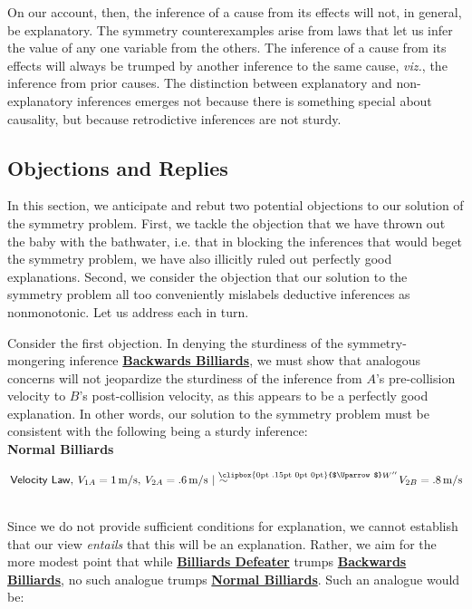 \documentclass[natbib]{svjour3}                     %
\makeatletter
\newcommand{\Uuparrow}{%
	\raisebox{.2ex}{\clipbox{0pt .15pt 0pt 0pt}{$\Uparrow$}}
}
\newcommand{\nms}{%
	\mathbin{\mathpalette\@nms\expandafter}
}
\newcommand{\@nms}{\mid\joinrel\mkern-.5mu\sim}
\newcommand{\mrc}[1]{\mathbin{
		\mathchoice
		{\normalsize\hspace{.5mm}\nms^{\mkern-19mu\scriptsize\Uuparrow#1}\hspace{-.5mm}}
		{\normalsize\hspace{.5mm}\nms^{\mkern-19mu\scriptsize\Uuparrow#1}\hspace{-.5mm}}
		{\footnotesize\hspace{.5mm}\nms^{\mkern-13.5mu\fontsize{5.5}{0}\Uuparrow#1}}
		{\scriptsize\nms^{\mkern-10mu\tiny\Uuparrow#1}}
	}
}
\makeatother
\begin{document}
On our account, then, the inference of a cause from its effects will not, in general, be explanatory.  The symmetry counterexamples arise from laws that let us infer the value of any one variable from the others. The inference of a cause from its effects will always be trumped by another inference to the same cause, \textit{viz.}, the inference from prior causes. The distinction between explanatory and non-explanatory inferences emerges not because there is something special about causality, but because retrodictive inferences are not sturdy.

\subsection{Objections and Replies}
\label{subsec:objections}
In this section, we anticipate and rebut two potential objections to our solution of the symmetry problem. First, we tackle the objection that we have thrown out the baby with the bathwater, i.e. that in blocking the inferences that would beget the symmetry problem, we have also illicitly ruled out perfectly good explanations. Second, we consider the objection that our solution to the symmetry problem all too conveniently mislabels deductive inferences as nonmonotonic. Let us address each in turn.

Consider the first objection. In denying the sturdiness of the symmetry-mongering inference \hyperref[eq:MRC_ballsbackwards]{\textbf{Backwards Billiards}}, we must show that analogous concerns will not jeopardize the sturdiness of the inference from $A$'s pre-collision velocity to $B$'s post-collision velocity, as this appears to be a perfectly good explanation. In other words, our solution to the symmetry problem must be consistent with the following being a sturdy inference:\\ 

\noindent \label{eq:MRC_ballsforward}\textbf{Normal Billiards}\hspace{8mm}\begin{minipage}[t]{.8\textwidth}
	$\hspace{.5ex}\mathsf{Velocity\ Law},\hspace{.5ex} V_{1A} = 1\,\text{m/s},\hspace{.5ex} V_{2A} = .6\,\text{m/s} \mrc{W''} V_{2B} = .8\,\text{m/s}$
\end{minipage}\\ 

Since we do not provide sufficient conditions for explanation, we cannot establish that our view \textit{entails} that this will be an explanation. Rather, we aim for the more modest point that while \hyperref[eq:MRC_defeater]{\textbf{Billiards Defeater}} trumps \hyperref[eq:MRC_ballsbackwards]{\textbf{Backwards Billiards}}, no such analogue trumps \hyperref[eq:MRC_ballsforward]{\textbf{Normal Billiards}}. Such an analogue would be:\\
\end{document}
